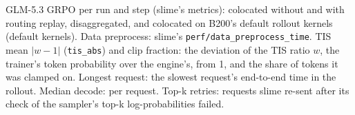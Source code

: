 \begin{table}[h]
  \caption{GLM-5.3 GRPO per run and step (slime's metrics): colocated without and with routing replay, disaggregated, and colocated on B200's default rollout kernels (default kernels). Data preprocess: slime's \texttt{perf/data\_preprocess\_time}. TIS mean $|w-1|$ (\texttt{tis\_abs}) and clip fraction: the deviation of the TIS ratio $w$, the trainer's token probability over the engine's, from 1, and the share of tokens it was clamped on. Longest request: the slowest request's end-to-end time in the rollout. Median decode: per request. Top-k retries: requests slime re-sent after its check of the sampler's top-k log-probabilities failed.}
  \label{tab:glm_rl_replay}
  \centering\small
  \begin{adjustbox}{max width=\linewidth}
  \end{adjustbox}
\end{table}

